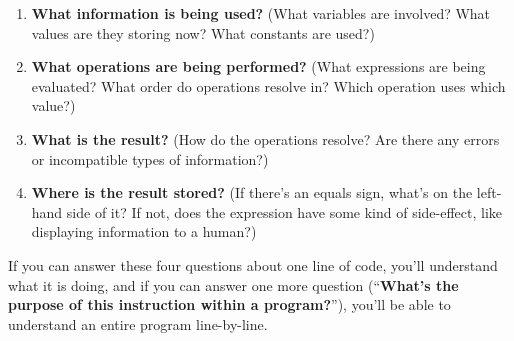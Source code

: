 \documentclass{handout}
\begin{document}
\begin{enumerate}
  \item \textbf{What information is being used?} (What variables are involved? What values are they storing now? What constants are used?)
  \item \textbf{What operations are being performed?} (What expressions are being evaluated? What order do operations resolve in? Which operation uses which value?)
  \item \textbf{What is the result?} (How do the operations resolve? Are there any errors or incompatible types of information?)
  \item \textbf{Where is the result stored?} (If there's an equals sign, what's on the left-hand side of it? If not, does the expression have some kind of side-effect, like displaying information to a human?)
\end{enumerate}

If you can answer these four questions about one line of code, you'll understand what it is doing, and if you can answer one more question (``\textbf{What's the purpose of this instruction within a program?}''), you'll be able to understand an entire program line-by-line.
\end{document}
